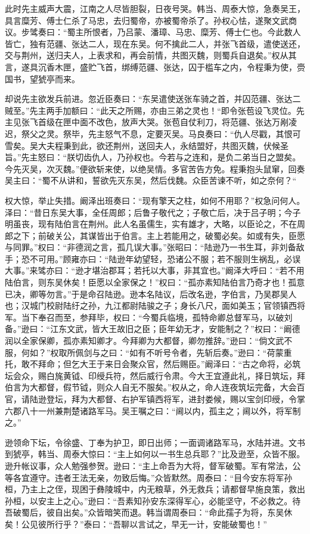 此时先主威声大震，江南之人尽皆胆裂，日夜号哭。韩当、周泰大惊，急奏吴王，具言糜芳、傅士仁杀了马忠，去归蜀帝，亦被蜀帝杀了。孙权心怯，遂聚文武商议。步骘奏曰：“蜀主所恨者，乃吕蒙、潘璋、马忠、糜芳、傅士仁也。今此数人皆亡，独有范疆、张达二人，现在东吴。何不擒此二人，并张飞首级，遣使送还，交与荆州，送归夫人，上表求和，再会前情，共图灭魏，则蜀兵自退矣。”权从其言，遂具沉香木匣，盛贮飞首，绑缚范疆、张达，囚于槛车之内，令程秉为使，赍国书，望猇亭而来。

却说先主欲发兵前进。忽近臣奏曰：“东吴遣使送张车骑之首，并囚范疆、张达二贼至。”先主两手加额曰：“此天之所赐，亦由三弟之灵也！“即令张苞设飞灵位。先主见张飞首级在匣中面不改色，放声大哭。张苞自仗利刀，将范疆、张达万剐凌迟，祭父之灵。祭毕，先主怒气不息，定要灭吴。马良奏曰：“仇人尽戳，其恨可雪矣。吴大夫程秉到此，欲还荆州，送回夫人，永结盟好，共图灭魏，伏候圣旨。”先主怒曰：“朕切齿仇人，乃孙权也。今若与之连和，是负二弟当日之盟矣。今先灭吴，次灭魏。”便欲斩来使，以绝吴情。多官苦告方免。程秉抱头鼠窜，回奏吴主曰：“蜀不从讲和，誓欲先灭东吴，然后伐魏。众臣苦谏不听，如之奈何？“

权大惊，举止失措。阚泽出班奏曰：“现有擎天之柱，如何不用耶？”权急问何人。泽曰：“昔日东吴大事，全任周郎；后鲁子敬代之；子敬亡后，决于吕子明；今子明虽丧，现有陆伯言在荆州。此人名虽儒生，实有雄才，大略，以臣论之，不在周郎之下；前破关公，其谋皆出于伯言。主上若能用之，破蜀必矣。如或有失，臣愿与同罪。”权曰：“非德润之言，孤几误大事。”张昭曰：“陆逊乃一书生耳，非刘备敌手；恐不可用。”顾雍亦曰：“陆逊年幼望轻，恐诸公不服；若不服则生祸乱，必误大事。”来骘亦曰：“逊才堪治郡耳；若托以大事，非其宜也。”阚泽大呼曰：“若不用陆伯言，则东吴休矣！臣愿以全家保之！”权曰：“孤亦素知陆伯言乃奇才也！孤意已决，卿等勿言。”于是命召陆逊。逊本名陆议，后改名逊，字伯言，乃吴郡吴人也；汉城门校尉陆纡之孙，九江都尉陆骏之子；身长八尺，面如美玉；官领镇西将军。当下奉召而至，参拜毕，权曰：“今蜀兵临境，孤特命卿总督军马，以破刘备。”逊曰：“江东文武，皆大王故旧之臣；臣年幼无才，安能制之？”权曰：“阚德润以全家保卿，孤亦素知卿才。今拜卿为大都督，卿勿推辞。”逊曰：“倘文武不服，何如？”权取所佩剑与之曰：“如有不听号令者，先斩后奏。”逊曰：“荷蒙重托，敢不拜命；但乞大王于来日会聚众官，然后赐臣。”阚泽曰：“古之命将，必筑坛会众，赐白旄黄钺、印绶兵符，然后威行令肃。今大王宜遵此礼，择日筑坛，拜伯言为大都督，假节钺，则众人自无不服矣。”权从之，命人连夜筑坛完备，大会百官，请陆逊登坛，拜为大都督、右护军镇西将军，进封娄候，赐以宝剑印绶，令掌六郡八十一州兼荆楚诸路军马。吴王嘱之曰：“阃以内，孤主之；阃以外，将军制之。”

逊领命下坛，令徐盛、丁奉为护卫，即日出师；一面调诸路军马，水陆并进。文书到猇亭，韩当、周泰大惊曰：“主上如何以一书生总兵耶？”比及逊至，众皆不服。逊升帐议事，众人勉强参贺。逊曰：“主上命吾为大将，督军破蜀。军有常法，公等各宜遵守。违者王法无亲，勿致后悔。”众皆默然。周泰曰：“目今安东将军孙桓，乃主上之侄，现困于彝陵城中，内无粮草，外无救兵；请都督早施良策，救出孙桓，以安主上之心。”逊曰：“吾素知孙安东深得军心，必能坚守，不必救之。待吾破蜀后，彼自出矣。”众皆暗笑而退。韩当谓周泰曰：“命此孺子为将，东吴休矣！公见彼所行乎？”泰曰：“吾聊以言试之，早无一计，安能破蜀也！”

